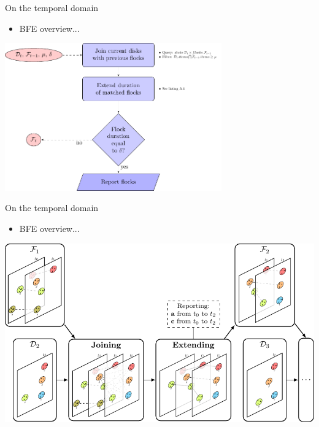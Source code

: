 \documentclass{beamer}
\begin{document}
    \begin{frame}{On the temporal domain}
        \begin{itemize} \item BFE overview... \end{itemize} \vspace{0.5cm}

        \centering
        \includegraphics[width=0.7\textwidth]{../thesis/chapter4/figures/FF_flowchart}
    \end{frame}

    \begin{frame}{On the temporal domain}
        \begin{itemize} \item BFE overview... \end{itemize} \vspace{0.5cm}

        \centering
        \includegraphics[width=\textwidth]{../thesis/chapter4/figures/Temporal/f_stages}
    \end{frame}
\end{document}
